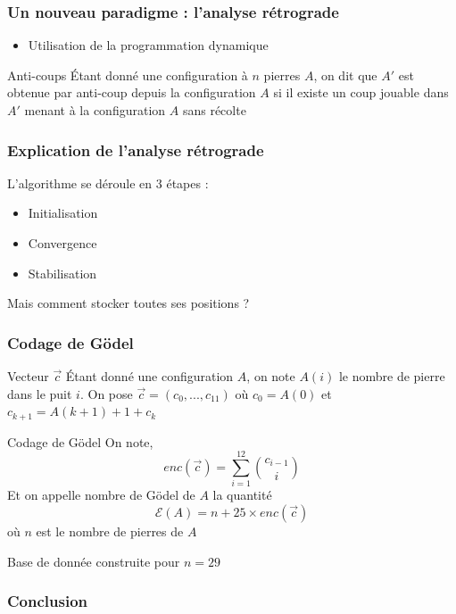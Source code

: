 \documentclass{beamer}
\begin{document}
\begin{frame}
  \frametitle{Un nouveau paradigme : l'analyse rétrograde}
  \begin{itemize}
  \item Utilisation de la programmation dynamique
  \end{itemize}
  \begin{block}{Anti-coups}
    Étant donné une configuration à $n$ pierres $A$, on dit que $A'$ est obtenue par anti-coup depuis la configuration $A$ si il existe un coup jouable dans $A'$ menant à la configuration $A$ sans récolte
  \end{block}
\end{frame}

\begin{frame}
  \frametitle{Explication de l'analyse rétrograde}
  L'algorithme se déroule en 3 étapes :
  \begin{itemize}
  \item Initialisation
  \item Convergence
  \item Stabilisation
  \end{itemize}
  Mais comment stocker toutes ses positions ?
\end{frame}

\begin{frame}
  \frametitle{Codage de Gödel}
  \begin{block}{Vecteur $\vec c$}
    Étant donné une configuration $A$, on note $A(i)$ le nombre de pierre dans le puit $i$. On pose $\vec c = (c_0, ..., c_{11})$ où $c_0 = A(0)$ et $c_{k+1}=A(k+1) + 1 + c_k$
  \end{block}
  \begin{block}{Codage de Gödel }
    On note, $$enc(\vec c) = \sum_{i=1}^{12} \binom {c_{i-1}} {i}$$
    Et on appelle nombre de Gödel de $A$ la quantité
    $$\mathcal E(A) = n + 25 \times enc(\vec c)$$ où $n$ est le nombre de pierres de $A$
  \end{block}
  Base de donnée construite pour $n = 29$
\end{frame}

\begin{frame}
  \frametitle{Conclusion}
\end{frame}
\end{document}
